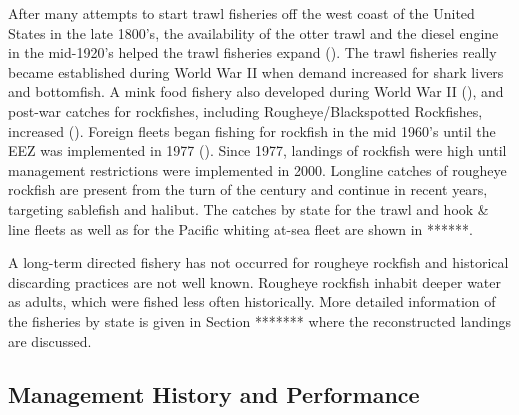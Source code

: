 \documentclass[
]{scrartcl}
\begin{document}
After many attempts to start trawl fisheries off the west coast of the
United States in the late 1800's, the availability of the otter trawl
and the diesel engine in the mid-1920's helped the trawl fisheries
expand ().
The trawl fisheries really became established during World War II when
demand increased for shark livers and bottomfish. A mink food fishery
also developed during World War II
(), and post-war
catches for rockfishes, including Rougheye/Blackspotted Rockfishes,
increased (). Foreign
fleets began fishing for rockfish in the mid 1960's until the EEZ was
implemented in 1977 (). Since 1977, landings of rockfish were high until management
restrictions were implemented in 2000. Longline catches of rougheye
rockfish are present from the turn of the century and continue in recent
years, targeting sablefish and halibut. The catches by state for the
trawl and hook \& line fleets as well as for the Pacific whiting at-sea
fleet are shown in ******.

A long-term directed fishery has not occurred for rougheye rockfish and
historical discarding practices are not well known. Rougheye rockfish
inhabit deeper water as adults, which were fished less often
historically. More detailed information of the fisheries by state is
given in Section ******* where the reconstructed landings are discussed.

\subsection{Management History and
Performance}\label{management-history-and-performance}
\end{document}
